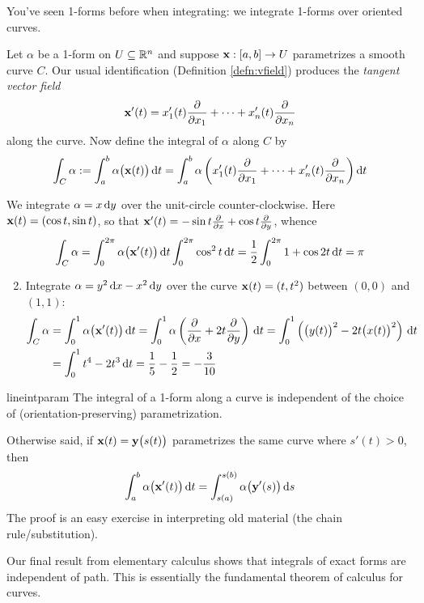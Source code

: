 You've seen 1-forms before when integrating: we integrate 1-forms over oriented curves.

\begin{defn}{}{}
Let $\alpha$ be a 1-form on $U\subseteq\mathbb{R}^n$ and suppose ${\mathbf{x}}:[a,b]\to U$ parametrizes a smooth curve $C$. Our usual identification (Definition \ref{defn:vfield}) produces the \emph{tangent vector field}
\[{\mathbf{x}}'(t)=x_1'(t)\frac{\partial }{\partial x_1}+\cdots +x_n'(t)\frac{\partial }{\partial x_n}\]
along the curve. Now define the integral of $\alpha$ along $C$ by
\[\int_{C}\alpha:=\int_a^b\alpha\bigl({\mathbf{x}}(t)\bigr)\,{\mathrm{d} t}=\int_a^b\alpha\left(x_1'(t)\frac{\partial }{\partial x_1}+\cdots +x_n'(t)\frac{\partial }{\partial x_n}\right){\mathrm{d} t}\]
\end{defn}


\begin{examples}{}{}
\exstart We integrate $\alpha=x\,{\mathrm{d} y}$ over the unit-circle counter-clockwise. Here ${\mathbf{x}}(t)=(\cos t,\sin t)$, so that ${\mathbf{x}}'(t)=-\sin t\frac{\partial }{\partial x}+\cos t\frac{\partial }{\partial y}$, whence
	\[\int_{C}\alpha=\int_0^{2\pi}\alpha\bigl({\mathbf{x}}'(t)\bigr)\,{\mathrm{d} t} \int_0^{2\pi}\cos^2t\,{\mathrm{d} t} =\frac 12\int_0^{2\pi}1+\cos 2t\,{\mathrm{d} t}=\pi\]
\begin{enumerate}\setcounter{enumi}{1}
	\item Integrate $\alpha=y^2\,{\mathrm{d} x}-x^2\,{\mathrm{d} y}$ over the curve ${\mathbf{x}}(t)=(t,t^2)$ between $(0,0)$ and $(1,1)$:
	\begin{align*}
	\int_{C}\alpha&=\int_0^1\alpha\bigl({\mathbf{x}}'(t)\bigr)\,{\mathrm{d} t} = \int_0^1\alpha\left(\frac{\partial }{\partial x}+2t\frac{\partial }{\partial y}\right)\,{\mathrm{d} t} =\int_0^1\left(\bigl(y(t)\bigr)^2-2t\bigl(x(t)\bigr)^2\right)\,{\mathrm{d} t}\\
	&=\int_0^1t^4-2t^3\,{\mathrm{d} t}=\frac 15-\frac 12=-\frac 3{10}
	\end{align*}
\end{enumerate}
\end{examples}

\begin{lemm}{}{lineintparam}
The integral of a 1-form along a curve is independent of the choice of (orientation-preserving) parametrization.
\end{lemm}

Otherwise said, if ${\mathbf{x}}(t)={\mathbf{y}}\bigl(s(t)\bigr)$ parametrizes the same curve where $s'(t)>0$, then
\[\int_a^b\alpha\bigl({\mathbf{x}}'(t)\bigr)\,{\mathrm{d} t}=\int_{s(a)}^{s(b)}\alpha\bigl({\mathbf{y}}'(s)\bigr)\,{\mathrm{d} s}\]
The proof is an easy exercise in interpreting old material (the chain rule/substitution).\smallbreak

Our final result from elementary calculus shows that integrals of exact forms are independent of path. This is essentially the fundamental theorem of calculus for curves.

